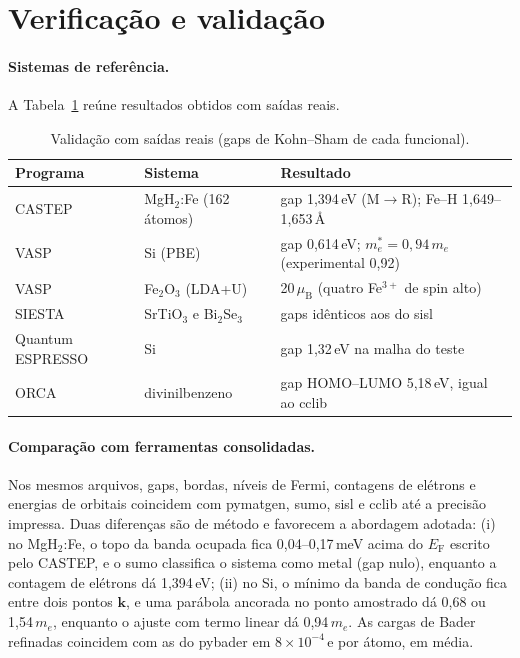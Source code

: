 \section{Verificação e validação}\label{sec:validacao}

\paragraph{Sistemas de referência.} A Tabela~\ref{tab:val} reúne resultados obtidos com saídas reais.

\begin{table}[htbp]\centering\small
\caption{Validação com saídas reais (gaps de Kohn--Sham de cada funcional).}\label{tab:val}
\begin{tabularx}{\linewidth}{@{}llX@{}}\toprule
Programa & Sistema & Resultado \\\midrule
CASTEP & MgH$_2$:Fe (162 átomos) & gap 1,394\,eV (M$\to$R); Fe--H 1,649--1,653\,Å \\
VASP & Si (PBE) & gap 0,614\,eV; $m^*_e=0{,}94\,m_e$ (experimental 0,92) \\
VASP & Fe$_2$O$_3$ (LDA+U) & 20\,$\mu_\mathrm B$ (quatro Fe$^{3+}$ de spin alto) \\
SIESTA & SrTiO$_3$ e Bi$_2$Se$_3$ & gaps idênticos aos do sisl \\
Quantum ESPRESSO & Si & gap 1,32\,eV na malha do teste \\
ORCA & divinilbenzeno & gap HOMO--LUMO 5,18\,eV, igual ao cclib \\\bottomrule
\end{tabularx}
\end{table}

\paragraph{Comparação com ferramentas consolidadas.} Nos mesmos arquivos, gaps, bordas, níveis de Fermi, contagens de elétrons e energias de orbitais coincidem com pymatgen, sumo, sisl e cclib até a precisão impressa. Duas diferenças são de método e favorecem a abordagem adotada: (i) no MgH$_2$:Fe, o topo da banda ocupada fica 0,04--0,17\,meV acima do $E_\mathrm F$ escrito pelo CASTEP, e o sumo classifica o sistema como metal (gap nulo), enquanto a contagem de elétrons dá 1,394\,eV; (ii) no Si, o mínimo da banda de condução fica entre dois pontos $\mathbf k$, e uma parábola ancorada no ponto amostrado dá 0,68 ou 1,54\,$m_e$, enquanto o ajuste com termo linear dá 0,94\,$m_e$. As cargas de Bader refinadas coincidem com as do pybader em $8\times10^{-4}$\,e por átomo, em média.

